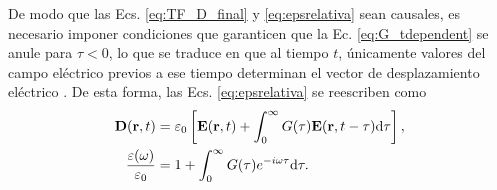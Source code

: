 De modo que las Ecs. \eqref{eq:TF_D_final} y \eqref{eq:epsrelativa} sean causales, es necesario imponer condiciones que garanticen que la Ec. \eqref{eq:G_tdependent} se anule para $\tau<0$, lo que se traduce en que al tiempo $t$, únicamente valores del campo eléctrico previos a ese tiempo determinan el vector de desplazamiento eléctrico \cite{jacksonClassicalElectrodynamics2021a}. De esta forma, las Ecs. \eqref{eq:epsrelativa} se reescriben como
%
\begin{align*}
	\vb{D}(\vb{r},t)&=\varepsilon_0\left[\vb{E}(\vb{r},t)+\int_{0}^{\infty}G(\tau)\vb{E}(\vb{r},t-\tau)\text{d}\tau\right],\\ \label{eq:TF_D_final}
	\frac{\varepsilon(\omega)}{\varepsilon_0}&=1+\int_{0}^{\infty}G(\tau) e^{-i\omega\tau}\text{d}\tau.
\end{align*}


















